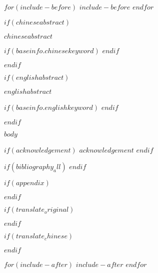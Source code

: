 \documentclass[$if(classoption)$$classoption$,$endif$]{thesis-swufe}
\begin{document}
$for(include-before)$
$include-before$
$endfor$





% 
$if(chineseabstract)$
\begin{chineseabstract}
  $chineseabstract$
  
  
  $if(baseinfo.chinesekeyword)$
  $endif$
\end{chineseabstract}
$endif$

% 
$if(englishabstract)$
\begin{englishabstract}
  $englishabstract$
  
  
  $if(baseinfo.englishkeyword)$
  $endif$
\end{englishabstract}
$endif$


\thesistableofcontents



\checkoddpage
\ifoddpage
    \blankpage
  \else
    \newpage
\fi
  \newpage
{}
\standardhead
{}
\setcounter{page}{1}

$body$



$if(acknowledgement)$
\thesisacknowledgement
$acknowledgement$
$endif$

$if(bibliography_all)$
\nocite{*}
$endif$




$if(appendix)$
  
$endif$




$if(translate_original)$
  
$endif$


$if(translate_chinese)$
  
$endif$


$for(include-after)$
$include-after$
$endfor$
\end{document}
